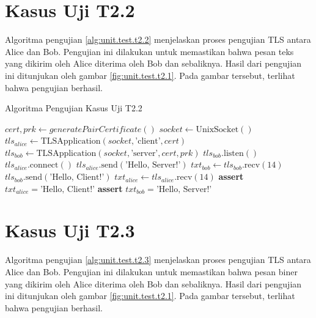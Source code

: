 \section{Kasus Uji T2.2}

Algoritma pengujian \ref{alg:unit.test.t2.2} menjelaskan proses pengujian TLS antara Alice dan Bob. Pengujian ini dilakukan untuk memastikan bahwa pesan teks yang dikirim oleh Alice diterima oleh Bob dan sebaliknya. Hasil dari pengujian ini ditunjukan oleh gambar \ref{fig:unit.test.t2.1}. Pada gambar tersebut, terlihat bahwa pengujian berhasil.

\begin{algorithm}
  \caption{Algoritma Pengujian Kasus Uji T2.2}
  \label{alg:unit.test.t2.2}
  \begin{algorithmic}
    \State $cert, prk \gets generatePairCertificate()$
    \State $socket \gets \text{UnixSocket}()$ 
    \State $tls_{alice} \gets \text{TLSApplication}(socket, \text{'client'}, cert)$ 
    \State $tls_{bob} \gets \text{TLSApplication}(socket, \text{'server'}, cert, prk)$
    \State
    \State $tls_{bob}.\text{listen}()$  
    \State $tls_{alice}.\text{connect}()$  
    \State
    \State $tls_{alice}.\text{send}(\text{'Hello, Server!'})$
    \State $txt_{bob} \gets tls_{bob}.\text{recv}(14)$
    \State
    \State $tls_{bob}.\text{send}(\text{'Hello, Client!'})$
    \State $txt_{alice} \gets tls_{alice}.\text{recv}(14)$
    \State
    \State \textbf{assert} $txt_{alice} = \text{'Hello, Client!'}$
    \State \textbf{assert} $txt_{bob} = \text{'Hello, Server!'}$
  \end{algorithmic}
\end{algorithm}

\section{Kasus Uji T2.3}

Algoritma pengujian \ref{alg:unit.test.t2.3} menjelaskan proses pengujian TLS antara Alice dan Bob. Pengujian ini dilakukan untuk memastikan bahwa pesan biner yang dikirim oleh Alice diterima oleh Bob dan sebaliknya. Hasil dari pengujian ini ditunjukan oleh gambar \ref{fig:unit.test.t2.1}. Pada gambar tersebut, terlihat bahwa pengujian berhasil.

